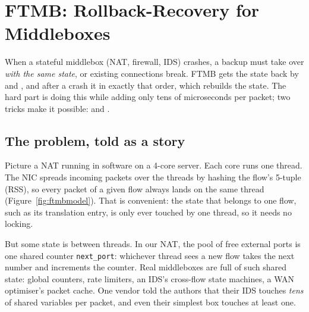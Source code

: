 \chapter{FTMB: Rollback-Recovery for Middleboxes}

\begin{keybox}
When a stateful middlebox (NAT, firewall, IDS) crashes, a backup must take over \emph{with the same state}, or existing
connections break. FTMB gets the state back by  and , and after a crash it  in exactly that order, which rebuilds the
state. The hard part is doing this while adding only tens of microseconds per packet; two tricks make it possible:
 and .
\end{keybox}

\section{The problem, told as a story}

Picture a NAT running in software on a 4-core server. Each core runs one thread. The NIC spreads incoming packets over the
threads by hashing the flow's 5-tuple (RSS), so every packet of a given flow always lands on the same thread
(Figure~\ref{fig:ftmbmodel}). That is convenient: the state that belongs to one flow, such as its translation entry, is only
ever touched by one thread, so it needs no locking.


But some state is  between threads. In our NAT, the pool of free external ports is one shared counter
\texttt{next\_port}: whichever thread sees a new flow takes the next number and increments the counter. Real middleboxes are full of
such shared state: global counters, rate limiters, an IDS's cross-flow state machines, a WAN optimiser's packet cache. One vendor
told the authors that their IDS touches \emph{tens} of shared variables per packet, and even their simplest box touches at least one.

